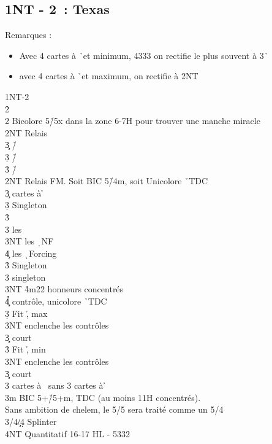\documentclass[a4paper]{article}
\begin{document}
\subsection{1NT - 2\pdfd\ : Texas \pdfh}

Remarques :

\begin{itemize}
\item Avec 4 cartes à \h\ et minimum, 4333 on rectifie le plus souvent à 3\h\ 

\item avec 4 cartes à \h\ et maximum, on rectifie à 2NT

\end{itemize}

\begin{bidtable}
1NT-2\d\\
2\h\+\\
2\s \> Bicolore 5\h /5x dans la zone 6-7H pour trouver une manche miracle\+\\
2NT \> Relais\+\\
3\c \> \h /\c \\
3\d \> \h /\d \\
3\h \> \h /\s \-\-\\
2NT \> Relais FM. Soit BIC 5\h /4m, soit Unicolore \h\ TDC\+\\
3\c {} cartes à \h \+\\
3\d \> Singleton \s \+\\
3\h\+\\
3\s \> les \c \\
3NT \> les \d\ NF\\
4\c \> les \d\ Forcing\-\-\\
3\h \> Singleton \c \\
3\s \> singleton \d \\
3NT \h 4m22 honneurs concentrés\\
4\c\d\h \> contrôle, unicolore \h\ TDC\-\\
3\d \> Fit \h , max\+\\
3NT \> enclenche les contrôles\\
3\c\d \> court\-\\
3\h \> Fit \h , min\+\\
3NT \> enclenche les contrôles\\
3\c\d \> court\-\\
3\s {} cartes à \s\ sans 3 cartes à \h \-\\
3m \> BIC 5+\h /5+m, TDC (au moins 11H concentrés).\\
\>Sans ambition de chelem, le 5/5 sera traité comme un 5/4\\
3\s/4\c/4\d \> Splinter\\
4NT \> Quantitatif 16-17 HL - 5332\-
\end{bidtable}
\end{document}
